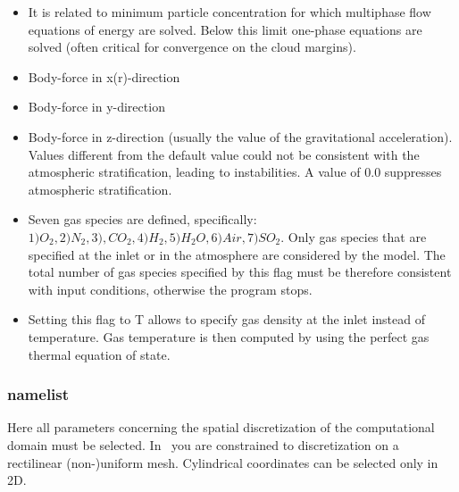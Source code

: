 \begin{itemize}
\item
{}
{It is related to minimum particle concentration for which multiphase flow
equations of energy are solved. Below this limit one-phase equations are solved
(often critical for convergence on the cloud margins).}

\item
{}
{Body-force in x(r)-direction}

\item
{}
{Body-force in y-direction}

\item
{}
{Body-force in z-direction (usually the value of the gravitational acceleration).
Values different from the default value could not be consistent with the 
atmospheric stratification, leading to instabilities. A value of 0.0 
suppresses atmospheric stratification}.

\item
{}
{Seven gas species are defined, specifically: \\
$ 1) O_2, 2) N_2, 3), CO_2, 4) H_2, 5) H_2O, 6) Air, 7) SO_2$. 
Only gas species that are specified at the inlet or in the
atmosphere are considered by the model. The total number of gas 
species specified by this flag must be therefore consistent with 
input conditions, otherwise the program stops.}

\item
{}
{Setting this flag to T allows to specify gas density at the inlet instead of
temperature. Gas temperature is then computed by using the perfect gas thermal
equation of state.}

\end{itemize}

\subsubsection{ namelist}
Here all parameters concerning the spatial discretization of the computational
domain must be selected. In \PDAC\ you are constrained to discretization 
on a rectilinear (non-)uniform mesh. Cylindrical coordinates can be
selected only in 2D.

